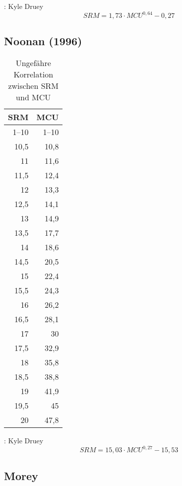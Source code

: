 \documentclass[a4paper,parskip=half]{scrartcl}
\newcommand{\MCU}{\mathit{MCU}}
\newcommand{\SRM}{\mathit{SRM}}
\begin{document}
\parencite{Morey}:
Kyle Druey
\begin{equation}
\SRM = 1,73 \cdot \MCU^{0,64} - 0,27
\label{eq:mcudanielsdruey}
\end{equation}

\parencite[10]{Holle2010}

\subsection*{Noonan (1996)}

\begin{table}[H]
\centering
\begin{tabular}{rr}
\toprule
\multicolumn{1}{c}{\textbf{SRM}} & \multicolumn{1}{c}{\textbf{MCU}} \\
\midrule
1–10 & 1–10 \\
10,5 & 10,8 \\
11   & 11,6 \\
11,5 & 12,4 \\
12   & 13,3 \\
12,5 & 14,1 \\
13   & 14,9 \\
13,5 & 17,7 \\
14   & 18,6 \\
14,5 & 20,5 \\
15   & 22,4 \\
15,5 & 24,3 \\
16   & 26,2 \\
16,5 & 28,1 \\
17   & 30 \\
17,5 & 32,9 \\
18   & 35,8 \\
18,5 & 38,8 \\
19   & 41,9 \\
19,5 & 45 \\
20   & 47,8 \\
\bottomrule
\end{tabular}
\caption{Ungefähre Korrelation zwischen SRM und MCU \parencite[206]{Noonan1996}}
\label{table:mcunoonan}
\end{table}

\parencite{Morey}:
Kyle Druey
\begin{equation}
\SRM = 15,03 \cdot \MCU^{0,27} - 15,53
\label{eq:mcunoonandruey}
\end{equation}

\parencite{Druey1998}

\subsection*{Morey}
\end{document}
